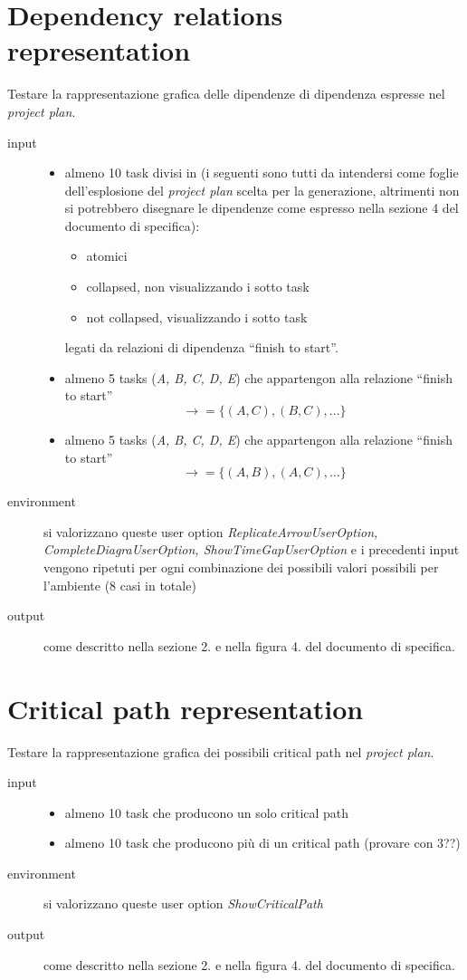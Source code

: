 \section{Dependency relations representation}
\label{sec:TNDependencyrepresentation}
Testare la rappresentazione grafica delle dipendenze di dipendenza espresse
nel \emph{project plan}.
\begin{description}
\item[input]  \quad
\begin{itemize}
  \item almeno 10 task divisi in (i seguenti sono tutti da intendersi come
  foglie dell'esplosione del \emph{project plan} scelta per la generazione,
  altrimenti non si potrebbero disegnare le dipendenze come espresso nella
  sezione 4 del documento di specifica):
  \begin{itemize}
  \item atomici
  \item collapsed, non visualizzando i sotto task
  \item not collapsed, visualizzando i sotto task 
  \end{itemize} legati da relazioni di dipendenza ``finish to start''.
  \item almeno 5 tasks (\emph{A, B, C, D, E}) che appartengon alla
relazione ``finish to start'' $$\rightarrow = \lbrace (A, C), (B, C), \ldots
\rbrace$$   
  \item almeno 5 tasks (\emph{A, B, C, D, E}) che appartengon alla
relazione ``finish to start'' $$\rightarrow = \lbrace (A, B), (A, C), \ldots
\rbrace$$
\end{itemize}
\item[environment] si valorizzano queste user option
\emph{ReplicateArrowUserOption, \\CompleteDiagraUserOption,
ShowTimeGapUserOption} e i precedenti input vengono ripetuti per ogni
combinazione dei possibili valori possibili per l'ambiente (8 casi in totale)
\item[output] come descritto nella sezione 2. e nella figura 4. del
documento di specifica.
\end{description}

\section{Critical path representation}
\label{sec:tn_criticalPathRepresentation}
Testare la rappresentazione grafica dei possibili critical path
nel \emph{project plan}.
\begin{description}
\item[input]  \quad
\begin{itemize}
  \item almeno 10 task che producono un solo critical path
  \item almeno 10 task che producono pi\`u di un critical path (provare con 3??)
\end{itemize}
\item[environment] si valorizzano queste user option
\emph{ShowCriticalPath}
\item[output] come descritto nella sezione 2. e nella figura 4. del
documento di specifica.
\end{description}


